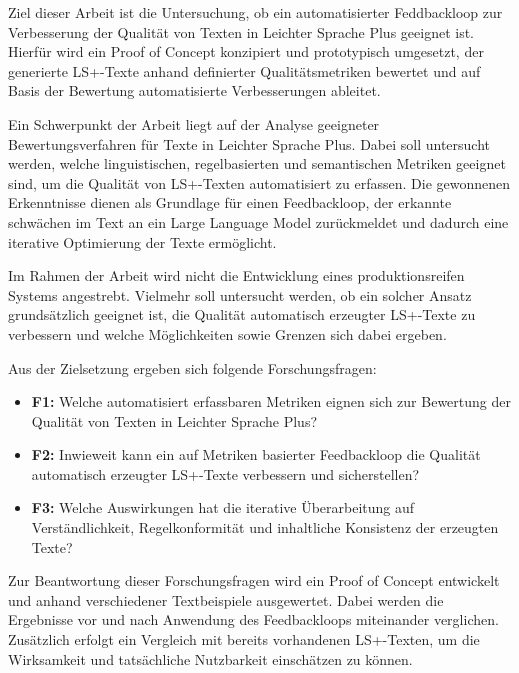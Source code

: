 Ziel dieser Arbeit ist die Untersuchung, ob ein automatisierter Feddbackloop zur Verbesserung der Qualität von Texten in Leichter Sprache Plus geeignet ist. Hierfür wird ein Proof of Concept konzipiert und prototypisch umgesetzt, der generierte LS+-Texte anhand definierter Qualitätsmetriken bewertet und auf Basis der Bewertung automatisierte Verbesserungen ableitet.

Ein Schwerpunkt der Arbeit liegt auf der Analyse geeigneter Bewertungsverfahren für Texte in Leichter Sprache Plus. Dabei soll untersucht werden, welche linguistischen, regelbasierten und semantischen Metriken geeignet sind, um die Qualität von LS+-Texten automatisiert zu erfassen.
Die gewonnenen Erkenntnisse dienen als Grundlage für einen Feedbackloop, der erkannte schwächen im Text an ein Large Language Model zurückmeldet und dadurch eine iterative Optimierung der Texte ermöglicht.

Im Rahmen der Arbeit wird nicht die Entwicklung eines produktionsreifen Systems angestrebt.
Vielmehr soll untersucht werden, ob  ein solcher Ansatz grundsätzlich geeignet ist, die Qualität automatisch erzeugter LS+-Texte zu verbessern und welche Möglichkeiten sowie Grenzen sich dabei ergeben.

Aus der Zielsetzung ergeben sich folgende Forschungsfragen:
\begin{itemize}
	\item \textbf{F1:} Welche automatisiert erfassbaren Metriken eignen sich zur Bewertung der Qualität von Texten in Leichter Sprache Plus?
	
	\item \textbf{F2:} Inwieweit kann ein auf Metriken basierter Feedbackloop die Qualität automatisch erzeugter LS+-Texte verbessern und sicherstellen?
	
	\item \textbf{F3:} Welche Auswirkungen hat die iterative Überarbeitung auf Verständlichkeit, Regelkonformität und inhaltliche Konsistenz der erzeugten Texte?
\end{itemize}

Zur Beantwortung dieser Forschungsfragen wird ein Proof of Concept entwickelt und anhand verschiedener Textbeispiele ausgewertet.
Dabei werden die Ergebnisse vor und nach Anwendung des Feedbackloops miteinander verglichen.
Zusätzlich erfolgt ein Vergleich mit bereits vorhandenen LS+-Texten, um die Wirksamkeit und tatsächliche Nutzbarkeit einschätzen zu können.